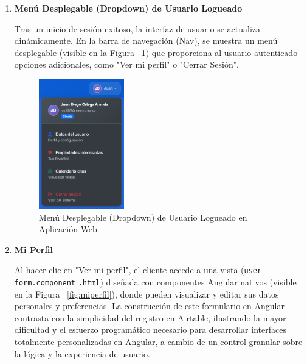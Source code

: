 \begin{enumerate}
\begin{enumerate}
        \item \textbf{Menú Desplegable (Dropdown) de Usuario Logueado}

        Tras un inicio de sesión exitoso, la interfaz de usuario se actualiza dinámicamente. En la barra de navegación (Nav), se muestra un menú desplegable (visible en la Figura ~\ref{fig:dropdownlogin}) que proporciona al usuario autenticado opciones adicionales, como "Ver mi perfil" o "Cerrar Sesión".

        \begin{figure}[H]
            \begin{center}
                \includegraphics[width = 0.35\textwidth]{Figuras/dropdownlogin.png}
            \end{center}
            \caption{\label{fig:dropdownlogin} Menú Desplegable (Dropdown) de Usuario Logueado en Aplicación Web}
        \end{figure}

        \item \textbf{Mi Perfil}

         Al hacer clic en "Ver mi perfil", el cliente accede a una vista (\texttt{user-form.component} \texttt{.html}) diseñada con componentes Angular nativos (visible en la Figura ~\ref{fig:miperfil}), donde pueden visualizar y editar sus datos personales y preferencias. La construcción de este formulario en Angular contrasta con la simplicidad del registro en Airtable, ilustrando la mayor dificultad y el esfuerzo programático necesario para desarrollar interfaces totalmente personalizadas en Angular, a cambio de un control granular sobre la lógica y la experiencia de usuario.


\end{enumerate}
\end{enumerate}
